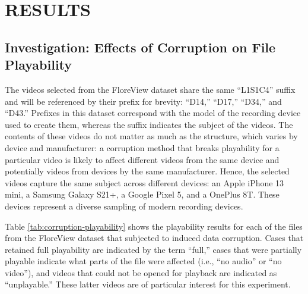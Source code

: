 \chapter{\uppercase{Results}}

\section{Investigation: Effects of Corruption on File Playability}

The videos selected from the FloreView dataset share the same ``L1S1C4'' suffix and will be referenced by their prefix for brevity: ``D14,'' ``D17,'' ``D34,'' and ``D43.'' Prefixes in this dataset correspond with the model of the recording device used to create them, whereas the suffix indicates the subject of the videos. The contents of these videos do not matter as much as the structure, which varies by device and manufacturer: a corruption method that breaks playability for a particular video is likely to affect different videos from the same device and potentially videos from devices by the same manufacturer. Hence, the selected videos capture the same subject across different devices: an Apple iPhone 13 mini, a Samsung Galaxy S21+, a Google Pixel 5, and a OnePlus 8T. These devices represent a diverse sampling of modern recording devices.

Table \ref{tab:corruption-playability} shows the playability results for each of the files from the FloreView dataset that subjected to induced data corruption. Cases that retained full playability are indicated by the term ``full,'' cases that were partially playable indicate what parts of the file were affected (i.e., ``no audio'' or ``no video''), and videos that could not be opened for playback are indicated as ``unplayable.'' These latter videos are of particular interest for this experiment.

